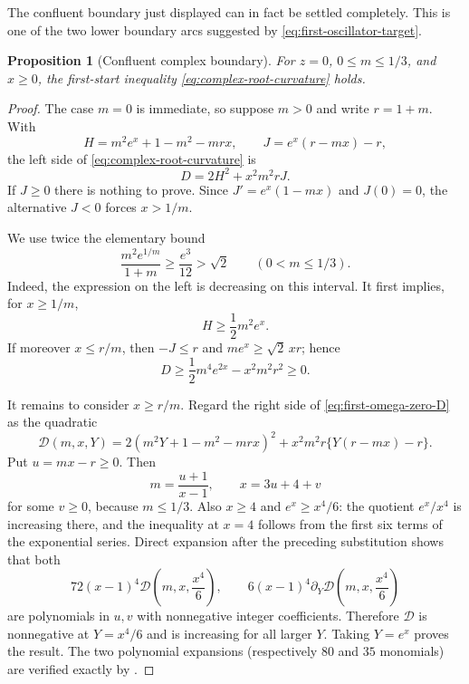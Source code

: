 \documentclass[11pt]{article}
\newtheorem{proposition}[theorem]{Proposition}
\theoremstyle{remark}
\begin{document}
The confluent boundary just displayed can in fact be settled completely.
This is one of the two lower boundary arcs suggested by
\eqref{eq:first-oscillator-target}.
\begin{proposition}[Confluent complex boundary]\label{prop:first-omega-zero}
For $z=0$, $0\leq m\leq1/3$, and $x\geq0$, the first-start inequality
\eqref{eq:complex-root-curvature} holds.
\end{proposition}
\begin{proof}
The case $m=0$ is immediate, so suppose $m>0$ and write $r=1+m$.  With
\[
 H=m^2e^x+1-m^2-mrx,\qquad
 J=e^x(r-mx)-r,
\]
the left side of \eqref{eq:complex-root-curvature} is
\begin{equation}\label{eq:first-omega-zero-D}
 D=2H^2+x^2m^2rJ.
\end{equation}
If $J\geq0$ there is nothing to prove.  Since
$J'=e^x(1-mx)$ and $J(0)=0$, the alternative $J<0$ forces $x>1/m$.

We use twice the elementary bound
\[
 \frac{m^2e^{1/m}}{1+m}\geq\frac{e^3}{12}>\sqrt2
 \qquad(0<m\leq1/3).
\]
Indeed, the expression on the left is decreasing on this interval.  It
first implies, for $x\geq1/m$,
\[
 H\geq\frac12m^2e^x.
\]
If moreover $x\leq r/m$, then $-J\leq r$ and
$me^x\geq\sqrt2\,xr$; hence
\[
 D\geq\frac12m^4e^{2x}-x^2m^2r^2\geq0.
\]

It remains to consider $x\geq r/m$.  Regard the right side of
\eqref{eq:first-omega-zero-D} as the quadratic
\[
 \mathcal D(m,x,Y)
 =2(m^2Y+1-m^2-mrx)^2+x^2m^2r\{Y(r-mx)-r\}.
\]
Put $u=mx-r\geq0$.  Then
\[
 m=\frac{u+1}{x-1},\qquad x=3u+4+v
\]
for some $v\geq0$, because $m\leq1/3$.  Also $x\geq4$ and
$e^x\geq x^4/6$: the quotient $e^x/x^4$ is increasing there, and the
inequality at $x=4$ follows from the first six terms of the exponential
series.  Direct expansion after the preceding substitution shows that both
\[
 72(x-1)^4\mathcal D\left(m,x,\frac{x^4}{6}\right),
 \qquad
 6(x-1)^4\partial_Y\mathcal D\left(m,x,\frac{x^4}{6}\right)
\]
are polynomials in $u,v$ with nonnegative integer coefficients.  Therefore
$\mathcal D$ is nonnegative at $Y=x^4/6$ and is increasing for all larger
$Y$.  Taking $Y=e^x$ proves the result.  The two polynomial expansions
(respectively $80$ and $35$ monomials) are verified exactly by
.
\end{proof}
\end{document}

